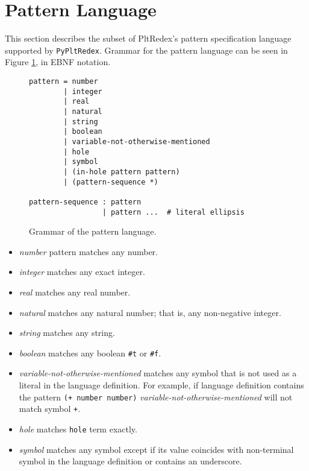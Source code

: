 \section{Pattern Language}

This section describes the subset of PltRedex's pattern specification language supported by \texttt{PyPltRedex}. Grammar for the pattern language can be seen in Figure \ref{pattern-grammar}, in EBNF notation. 

\begin{figure}[h]
\begin{verbatim}
pattern = number 
        | integer 
        | real 
        | natural 
        | string 
        | boolean 
        | variable-not-otherwise-mentioned 
        | hole 
        | symbol
        | (in-hole pattern pattern)
        | (pattern-sequence *) 

pattern-sequence : pattern 
                 | pattern ...  # literal ellipsis
\end{verbatim}
\caption{Grammar of the pattern language.}
\label{pattern-grammar}
\end{figure}

\begin{itemize}
\item
\textit{number} pattern matches any number.

\item
\textit{integer} matches any exact integer. 

\item
\textit{real} matches any real number.

\item
\textit{natural} matches any natural number; that is, any non-negative integer.

\item
\textit{string} matches any string.

\item
\textit{boolean} matches any boolean \texttt{\#t} or \texttt{\#f}.
\item
\textit{variable-not-otherwise-mentioned} matches any symbol that is not used as a literal in the language definition. For example, if language definition contains the pattern \texttt{(+ number number)} \textit{variable-not-otherwise-mentioned} will not match symbol \texttt{+}.

\item
\textit{hole} matches \texttt{hole} term exactly.

\item
\textit{symbol} matches any symbol except if its value coincides with non-terminal symbol in the language definition or contains an underscore.
\end{itemize}

